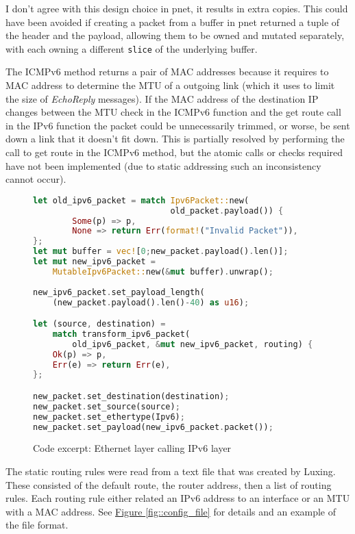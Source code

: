 \documentclass[12pt,a4paper,twoside,openright]{report}
\begin{document}
I don't agree with this design choice in pnet, it results in extra copies. This could have been avoided if creating a packet from a buffer in pnet returned a tuple of the header and the payload, allowing them to be owned and mutated separately, with each owning a different \verb!slice! of the underlying buffer. 

The ICMPv6 method returns a pair of MAC addresses because it requires to MAC address to determine the MTU of a outgoing link (which it uses to limit the size of \textit{EchoReply} messages).  If the MAC address of the destination IP changes between the MTU check in the ICMPv6 function and the get route call in the IPv6 function the packet could be unnecessarily trimmed, or worse, be sent down a link that it doesn't fit down. This is partially resolved by performing the call to get route in the ICMPv6 method, but the atomic calls or checks required have not been implemented (due to static addressing such an inconsistency cannot occur).

\begin{figure}
\centering
\begin{varwidth}{\linewidth}
\begin{lstlisting}[language=Rust]
let old_ipv6_packet = match Ipv6Packet::new(
                            old_packet.payload()) {
        Some(p) => p,
        None => return Err(format!("Invalid Packet")),
};
let mut buffer = vec![0;new_packet.payload().len()];
let mut new_ipv6_packet = 
    MutableIpv6Packet::new(&mut buffer).unwrap();
    
new_ipv6_packet.set_payload_length(
    (new_packet.payload().len()-40) as u16);

let (source, destination) = 
    match transform_ipv6_packet(
        old_ipv6_packet, &mut new_ipv6_packet, routing) {
    Ok(p) => p,
    Err(e) => return Err(e),
};

new_packet.set_destination(destination);
new_packet.set_source(source);
new_packet.set_ethertype(Ipv6);
new_packet.set_payload(new_ipv6_packet.packet());
\end{lstlisting}
\end{varwidth}
\caption{Code excerpt: Ethernet layer calling IPv6 layer}
\label{fig::mutability}
\end{figure}

\bigskip

The static routing rules were read from a text file that was created by Luxing. These consisted of the default route, the router address, then a list of routing rules.  Each routing rule either related an IPv6 address to an interface or an MTU with a MAC address. See \hyperref[fig::config_file]{Figure }\ref{fig::config_file} for details and an example of the file format. 
\end{document}
